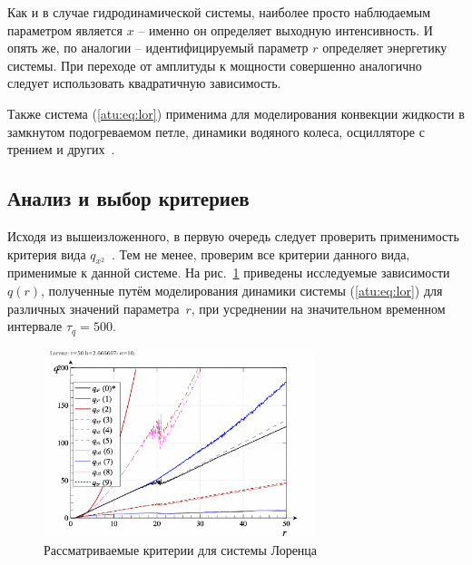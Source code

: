 Как и в случае гидродинамической системы, наиболее просто наблюдаемым
параметром является $x$ -- именно он определяет выходную интенсивность. И
опять же, по аналогии -- идентифицируемый параметр $r$ определяет энергетику
системы. При переходе от амплитуды к мощности совершенно аналогично
следует использовать квадратичную зависимость.

Также система (\ref{atu:eq:lor}) применима для
моделирования конвекции жидкости в замкнутом подогреваемом петле,
динамики водяного колеса, осцилляторе с трением и других~\cite{kuznetsov_dyn_chaos,atu_arsirii}.



\subsection{Анализ и выбор критериев}  %

Исходя из вышеизложенного, в первую очередь следует проверить применимость
критерия вида $q_{x^2}$~\cite{atu_apir2012}. Тем не менее, проверим все
критерии данного вида, применимые к данной системе.
На рис.~\ref{atu:f:lor_q} приведены исследуемые зависимости
$q(r)$, полученные путём моделирования динамики
системы (\ref{atu:eq:lor}) для различных значений параметра~$r$,
при усреднении на значительном временном интервале $\tau_q=500$.


\begin{figure}[ht!]
  \centerline{\includegraphics[width=0.7\textwidth]{p/cha/lor/lor_q-p_q_r.png} }
  \caption{Рассматриваемые критерии для системы Лоренца}
  \label{atu:f:lor_q}
\end{figure}

